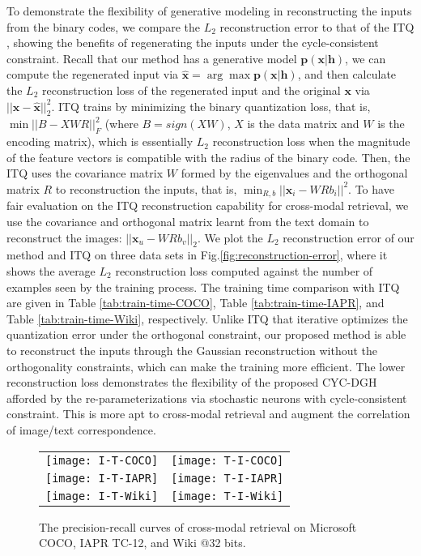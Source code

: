 \documentclass[10pt,journal,twocolumn]{IEEEtran}
\begin{document}
To demonstrate the flexibility of generative modeling in reconstructing the inputs from the binary codes, we compare the $L_2$ reconstruction error to that of the ITQ \cite{ITQ}, showing the benefits of regenerating the inputs under the cycle-consistent constraint. Recall that our method has a generative model $\boldsymbol p(\boldsymbol x|\boldsymbol h)$, we can compute the regenerated input via $\hat{\boldsymbol x}=\arg\max \boldsymbol p(\boldsymbol x|\boldsymbol h)$, and then calculate the $L_2$ reconstruction loss of the regenerated input and the original $\boldsymbol x$ via $||\boldsymbol x- \hat{\boldsymbol x}||_2^2$. ITQ \cite{ITQ} trains by minimizing the binary quantization loss, that is, $\min ||B-XWR||_F^2$ (where $B=sign(XW)$, $X$ is the data matrix and $W$ is the encoding matrix), which is essentially $L_2$ reconstruction loss when the magnitude of the feature vectors is compatible with the radius of the binary code. Then, the ITQ \cite{ITQ} uses the covariance matrix $W$ formed by the eigenvalues and the orthogonal matrix $R$ to reconstruction the inputs, that is, $\min_{R, b}||\boldsymbol x_i - W R b_i||^2$. To have fair evaluation on the ITQ reconstruction capability for cross-modal retrieval, we use the covariance and orthogonal matrix learnt from the text domain to reconstruct the images: $||\boldsymbol x_u - W R b_v||_2$.  We plot the $L_2$ reconstruction error of our method and ITQ \cite{ITQ} on three data sets in Fig.\ref{fig:reconstruction-error}, where it shows the average $L_2$ reconstruction loss computed against the number of examples seen by the training process. The training time comparison with ITQ \cite{ITQ} are given in Table \ref{tab:train-time-COCO}, Table \ref{tab:train-time-IAPR}, and Table \ref{tab:train-time-Wiki}, respectively. Unlike ITQ \cite{ITQ} that iterative optimizes the quantization error under the orthogonal constraint, our proposed method is able to reconstruct the inputs through the Gaussian reconstruction without the orthogonality constraints, which can make the training more efficient. The lower reconstruction loss demonstrates the flexibility of the proposed CYC-DGH afforded by the re-parameterizations via stochastic neurons with cycle-consistent constraint. This is more apt to cross-modal retrieval and augment the correlation of image/text correspondence.




\begin{figure}[hbt]
\begin{tabular}{cc}
\texttt{[image: I-T-COCO]}&
\texttt{[image: T-I-COCO]}\\
\texttt{[image: I-T-IAPR]}&
\texttt{[image: T-I-IAPR]}\\
\texttt{[image: I-T-Wiki]}&
\texttt{[image: T-I-Wiki]}\\
\end{tabular}
\caption{The precision-recall curves of cross-modal retrieval on Microsoft COCO, IAPR TC-12, and Wiki @32 bits.}
\label{fig:precision-recall}
\end{figure}
\end{document}

